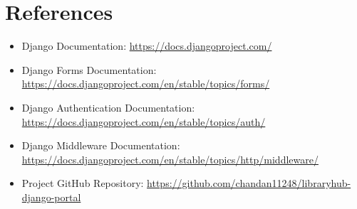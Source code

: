 \documentclass[12pt,a4paper]{article}
\begin{document}
\section{References}
\begin{itemize}
    \item Django Documentation: \url{https://docs.djangoproject.com/}
    \item Django Forms Documentation: \url{https://docs.djangoproject.com/en/stable/topics/forms/}
    \item Django Authentication Documentation: \url{https://docs.djangoproject.com/en/stable/topics/auth/}
    \item Django Middleware Documentation: \url{https://docs.djangoproject.com/en/stable/topics/http/middleware/}
    \item Project GitHub Repository: \url{https://github.com/chandan11248/libraryhub-django-portal}
\end{itemize}
\end{document}

